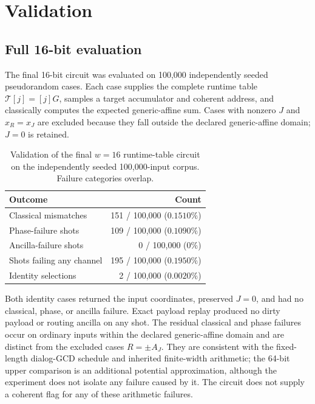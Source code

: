 \documentclass[10pt]{article}
\begin{document}
\section{Validation}

\subsection{Full 16-bit evaluation}

The final 16-bit circuit was evaluated on 100,000 independently seeded pseudorandom cases. Each case supplies the complete runtime table $\mathcal T[j]=[j]G$, samples a target accumulator and coherent address, and classically computes the expected generic-affine sum. Cases with nonzero $J$ and $x_R=x_J$ are excluded because they fall outside the declared generic-affine domain; $J=0$ is retained.

\begin{table}[ht]
\centering
\small
\begin{tabular}{@{}lr@{}}
\toprule
Outcome & Count \\
\midrule
Classical mismatches & 151 / 100,000 ($0.1510\%$) \\
Phase-failure shots & 109 / 100,000 ($0.1090\%$) \\
Ancilla-failure shots & 0 / 100,000 ($0\%$) \\
Shots failing any channel & 195 / 100,000 ($0.1950\%$) \\
Identity selections & 2 / 100,000 ($0.0020\%$) \\
\bottomrule
\end{tabular}
\caption{Validation of the final $w=16$ runtime-table circuit on the independently seeded 100,000-input corpus. Failure categories overlap.}
\label{tab:full-errors}
\end{table}

Both identity cases returned the input coordinates, preserved $J=0$, and had no classical, phase, or ancilla failure. Exact payload replay produced no dirty payload or routing ancilla on any shot. The residual classical and phase failures occur on ordinary inputs within the declared generic-affine domain and are distinct from the excluded cases $R=\pm A_J$. They are consistent with the fixed-length dialog-GCD schedule and inherited finite-width arithmetic; the 64-bit upper comparison is an additional potential approximation, although the experiment does not isolate any failure caused by it. The circuit does not supply a coherent flag for any of these arithmetic failures.
\end{document}
